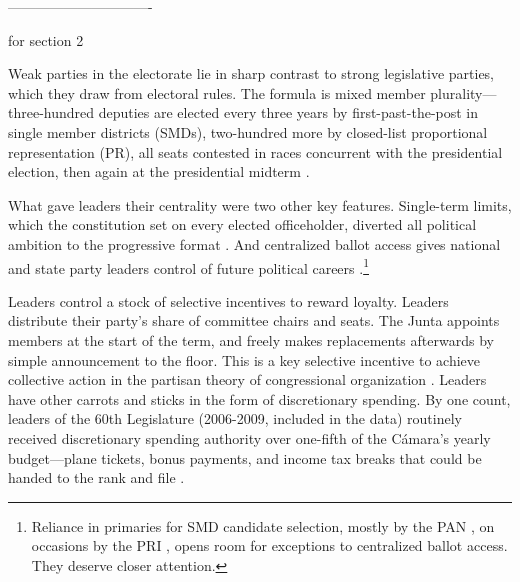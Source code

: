 


-------------------------------

for section 2



Weak parties in the electorate lie in sharp contrast to strong legislative parties, which they draw from electoral rules. The formula is mixed member plurality---three-hundred deputies are elected every three years by first-past-the-post in single member districts (SMDs), two-hundred more by closed-list proportional representation (PR), all seats contested in races concurrent with the presidential election, then again at the presidential midterm \citep{weldonMixedMemberSys2001}.

What gave leaders their centrality were two other key features. Single-term limits, which the constitution set on every elected officeholder, diverted all political ambition to the progressive format \citep{schlesinger.1966}. And centralized ballot access gives national and state party leaders control of future political careers \citep{langston.2008}.\footnote{Reliance in primaries for SMD candidate selection, mostly by the PAN \citep{ascencio.kerevel.cand-sel-beh.2021}, on occasions by the PRI \citep{poire.phd.2002}, opens room for exceptions to centralized ballot access. They deserve closer attention.}

Leaders control a stock of selective incentives to reward loyalty. Leaders distribute their party's share of committee chairs and seats. The Junta appoints members at the start of the term, and freely makes replacements afterwards by simple announcement to the floor. This is a key selective incentive to achieve collective action in the partisan theory of congressional organization \citep{cox.mccubbins.1993}. Leaders have other carrots and sticks in the form of discretionary spending. By one count, leaders of the 60th Legislature (2006-2009, included in the data) routinely received discretionary spending authority over one-fifth of the Cámara's yearly budget---plane tickets, bonus payments, and income tax breaks that could be handed to the rank and file \citep{casar.2011}.

